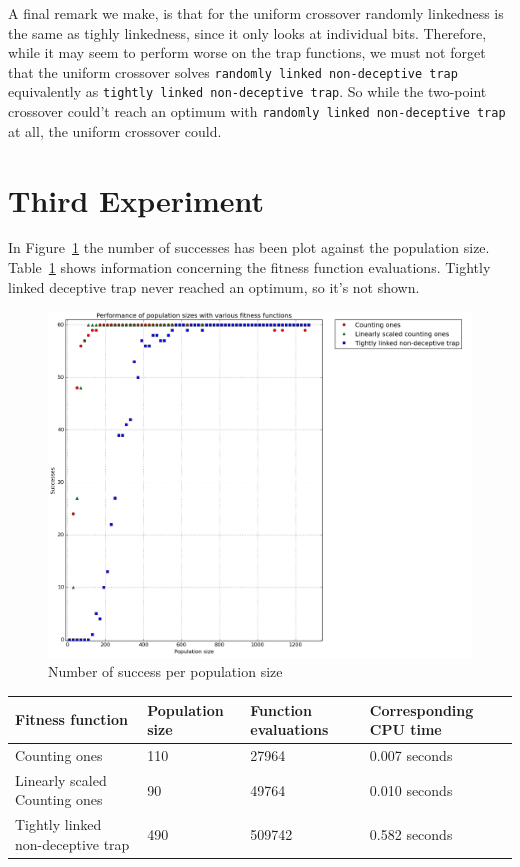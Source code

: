 \documentclass[12pt]{article}
\theoremstyle{definition}
\newcommand{\tnt}{\texttt{tightly linked non-deceptive trap}}
\newcommand{\rnt}{\texttt{randomly linked non-deceptive trap}}
\begin{document}
A final remark we make, is that for the uniform crossover randomly linkedness is the same
as tighly linkedness, since it only looks at individual bits.
Therefore, while it may seem to perform worse on the trap functions, we must not forget
that the uniform crossover solves \rnt{} equivalently as \tnt{}.
So while the two-point crossover could't reach an optimum with \rnt{} at all,
the uniform crossover could.


\section{Third Experiment}
\label{ssec:exp3}
In Figure~\ref{fig:exp3} the number of successes has been plot against the population size.
Table~\ref{tab:exp3} shows information concerning the fitness function evaluations.
Tightly linked deceptive trap never reached an optimum, so it's not shown.

\begin{figure}[!htb]
    \centering
    \includegraphics[totalheight=0.7\textheight]{images/exp3.png}
    \caption{Number of success per population size}
\label{fig:exp3}
\end{figure}

\begin{table}[!htb]
\begin{adjustwidth}{0cm}{}
\centering
\begin{tabular}{lp{2.5cm}p{2.5cm}p{2.8cm}}
\toprule[1.5pt]
\bf Fitness function & \bf Population size & \bf Function evaluations & \bf Corresponding CPU time\\\midrule
Counting ones & 110 & 27964 & 0.007 seconds \\
Linearly scaled Counting ones & 90 & 49764 & 0.010 seconds \\
Tightly linked non-deceptive trap & 490 & 509742 & 0.582 seconds \\
\bottomrule[1.25pt]
\end{tabular}\par
\bigskip
{}
\label{tab:exp3}
\end{adjustwidth}
\end{table}
\end{document}
